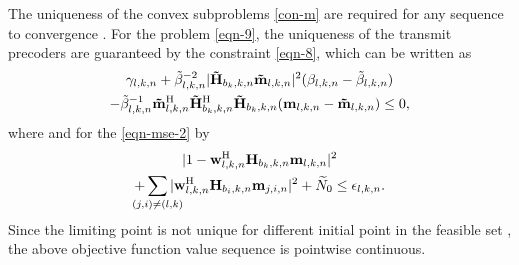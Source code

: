 The uniqueness of the convex subproblems \eqref{con-m} are required for any sequence to convergence \cite{rudin1964principles}. For the problem \eqref{eqn-9}, the uniqueness of the transmit precoders are guaranteed by the constraint \eqref{eqn-8}, which can be written as
\begin{multline}
\gamma_{l,k,n} + \tilde{\beta}_{l,k,n}^{-2} |\mathbf{\tilde{H}}_{b_k,k,n} \mathbf{\tilde{m}}_{l,k,n}|^2 (\beta_{l,k,n} - \tilde{\beta}_{l,k,n}) \\
- \tilde{\beta}_{l,k,n}^{-1} \mathbf{\tilde{m}}_{l,k,n}^{\mathrm{H}} \mathbf{\tilde{H}}_{b_k,k,n}^{\mathrm{H}} \mathbf{\tilde{H}}_{b_k,k,n} (\mathbf{m}_{l,k,n} - \mathbf{\tilde{m}}_{l,k,n}) \leq 0,
\end{multline}
where  and for the \eqref{eqn-mse-2} by
\begin{multline}
| 1 - \mvec{w}{l,k,n}^\herm \mvec{H}{b_k,k,n} \mvec{m}{l,k,n} |^2 \\ + \sum_{\mathclap{(j,i) \neq (l,k)}} | \mvec{w}{l,k,n}^\herm \mvec{H}{b_i,k,n} \mvec{m}{j,i,n} |^2 + \enoise \leq \epsilon_{l,k,n}.
\end{multline}
Since the limiting point is not unique for different initial point in the feasible set , the above objective function value sequence is pointwise continuous.

